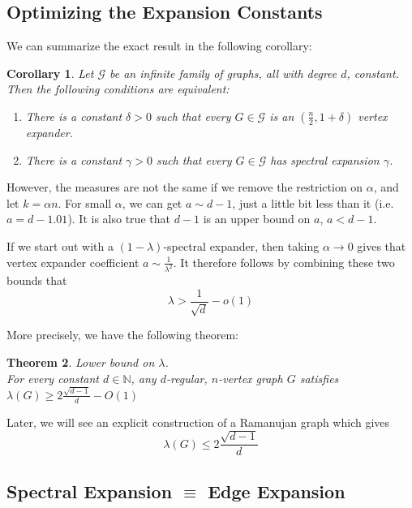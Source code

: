 \documentclass[11pt]{article}
\newtheorem{theorem}{Theorem}[section]
\newtheorem{corollary}[theorem]{Corollary}
\theoremstyle{definition}
\theoremstyle{definition}
\theoremstyle{definition}
\newcommand{\mc}[1]
{\mathcal{#1}}
\begin{document}
\subsection{Optimizing the Expansion Constants}

We can summarize the exact result in the following corollary: 
\begin{corollary}
Let $\mc{G}$ be an infinite family of graphs, all with
degree $d$, constant. Then the following conditions are equivalent: 
\begin{enumerate}

\item There is a constant $\delta > 0$ such that every $G \in \mc{G}$ is an
$(\frac{n}{2}, 1 + \delta)$ vertex expander.

\item There is a constant $\gamma > 0$ such that every $G \in \mc{G}$ has 
spectral expansion $\gamma$. 
\end{enumerate}
\end{corollary}

However, the measures are not the same if we remove the restriction on $\alpha$, and let $k = \alpha n$. For small $\alpha$, we can get $a \sim d - 1$, just a little bit less than it (i.e. $a = d - 1.01$). It is also true that $d - 1$ is an upper bound on $a$, $a < d - 1$.

If we start out with a $(1 - \lambda)$-spectral expander, then taking $\alpha \to 0$ gives that vertex expander coefficient $a \sim \frac{1}{\lambda^2}$. It therefore follows by combining these two bounds that 
\[
\lambda > \frac{1}{\sqrt{d}} - o(1)
\]

More precisely, we have the following theorem: 

\begin{theorem} Lower bound on $\lambda$. \\
For every constant $d \in \mathbb{N}$, any $d$-regular, $n$-vertex
graph $G$ satisfies $\lambda(G) \geq 2\frac{\sqrt{d - 1}}{d} - O(1)$
\end{theorem}
Later, we will see an explicit construction of a Ramanujan graph which gives 
\[
\lambda(G) \leq 2\frac{\sqrt{d - 1}}{d}
\]

\subsection{Spectral Expansion $\equiv$ Edge Expansion}
\end{document}
